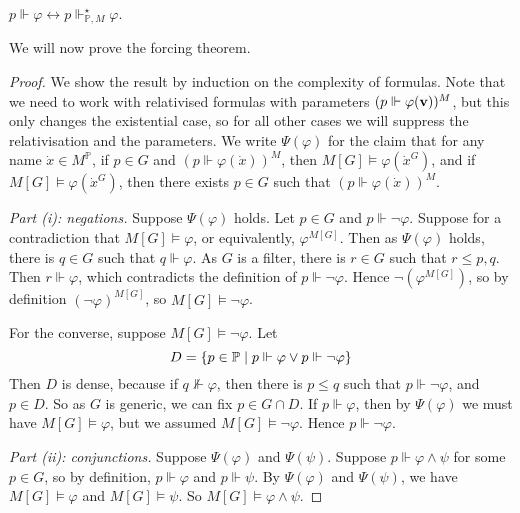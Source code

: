 \begin{corollary}
    \( p \Vdash \varphi \leftrightarrow p \Vdash^\star_{\mathbb P, M} \varphi \).
\end{corollary}
We will now prove the forcing theorem.
\begin{proof}
    We show the result by induction on the complexity of formulas.
    Note that we need to work with relativised formulas with parameters \( (p \Vdash \varphi(\vb v))^M \), but this only changes the existential case, so for all other cases we will suppress the relativisation and the parameters.
    We write \( \Psi(\varphi) \) for the claim that for any name \( \dot x \in M^{\mathbb P} \), if \( p \in G \) and \( (p \Vdash \varphi(\dot x))^M \), then \( M[G] \vDash \varphi(\dot x^G) \), and if \( M[G] \vDash \varphi(\dot x^G) \), then there exists \( p \in G \) such that \( (p \Vdash \varphi(\dot x))^M \).

    \emph{Part (i): negations.}
    Suppose \( \Psi(\varphi) \) holds.
    Let \( p \in G \) and \( p \Vdash \neg \varphi \).
    Suppose for a contradiction that \( M[G] \vDash \varphi \), or equivalently, \( \varphi^{M[G]} \).
    Then as \( \Psi(\varphi) \) holds, there is \( q \in G \) such that \( q \Vdash \varphi \).
    As \( G \) is a filter, there is \( r \in G \) such that \( r \leq p, q \).
    Then \( r \Vdash \varphi \), which contradicts the definition of \( p \Vdash \neg\varphi \).
    Hence \( \neg(\varphi^{M[G]}) \), so by definition \( (\neg \varphi)^{M[G]} \), so \( M[G] \vDash \neg\varphi \).

    For the converse, suppose \( M[G] \vDash \neg\varphi \).
    Let
    \[ D = \qty{p \in \mathbb P \mid p \Vdash \varphi \vee p \Vdash \neg\varphi} \]
    Then \( D \) is dense, because if \( q \nVdash \varphi \), then there is \( p \leq q \) such that \( p \Vdash \neg\varphi \), and \( p \in D \).
    So as \( G \) is generic, we can fix \( p \in G \cap D \).
    If \( p \Vdash \varphi \), then by \( \Psi(\varphi) \) we must have \( M[G] \vDash \varphi \), but we assumed \( M[G] \vDash \neg\varphi \).
    Hence \( p \Vdash \neg\varphi \).

    \emph{Part (ii): conjunctions.}
    Suppose \( \Psi(\varphi) \) and \( \Psi(\psi) \).
    Suppose \( p \Vdash \varphi \wedge \psi \) for some \( p \in G \), so by definition, \( p \Vdash \varphi \) and \( p \Vdash \psi \).
    By \( \Psi(\varphi) \) and \( \Psi(\psi) \), we have \( M[G] \vDash \varphi \) and \( M[G] \vDash \psi \).
    So \( M[G] \vDash \varphi \wedge \psi \).


\end{proof}
